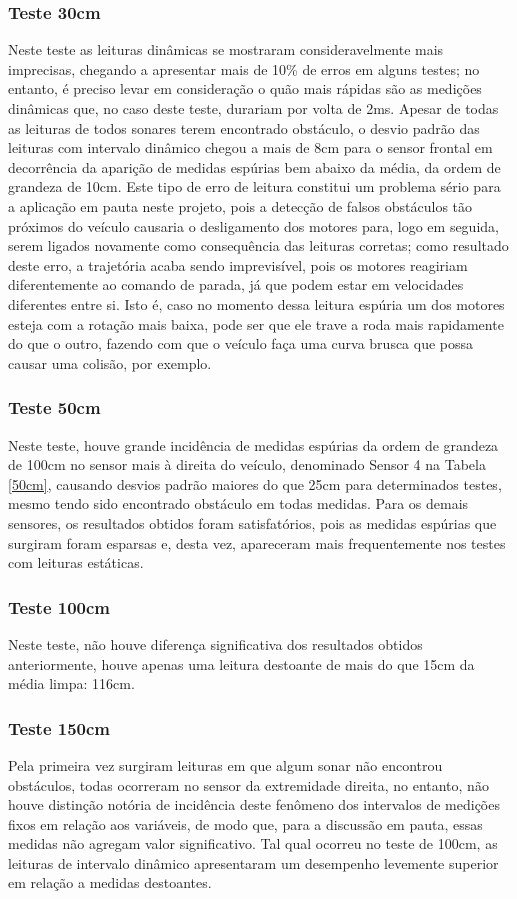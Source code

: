 \subsubsection{Teste 30cm}
Neste teste as leituras dinâmicas se mostraram consideravelmente mais imprecisas, chegando a apresentar mais de 10\% de erros em alguns testes; no 
entanto, é preciso levar em consideração o quão mais rápidas são as medições dinâmicas que, no caso deste teste, durariam por volta de 2ms.
Apesar de todas as leituras de todos sonares terem encontrado obstáculo, o desvio padrão das leituras com intervalo dinâmico chegou a mais de 8cm 
para o sensor frontal em decorrência da aparição de medidas espúrias bem abaixo da média, da ordem de grandeza de 10cm. 
Este tipo de erro de leitura constitui um problema sério para a aplicação em pauta neste projeto, pois a detecção de falsos obstáculos tão próximos 
do veículo causaria o desligamento dos motores para, logo em seguida, serem ligados novamente como consequência das leituras corretas; como resultado 
deste erro, a trajetória acaba sendo imprevisível, pois os motores reagiriam diferentemente ao comando de parada, já que podem estar em velocidades 
diferentes entre si. Isto é, caso no momento dessa leitura espúria um dos motores esteja com a rotação mais baixa, pode ser que ele trave a roda mais 
rapidamente do que o outro, fazendo com que o veículo faça uma curva brusca que possa causar uma colisão, por exemplo.
\subsubsection{Teste 50cm}
Neste teste, houve grande incidência de medidas espúrias da ordem de grandeza de 100cm no sensor mais à direita do veículo, denominado Sensor 4 na 
Tabela \ref{50cm}, causando desvios padrão maiores do que 25cm para determinados testes, mesmo tendo sido encontrado obstáculo em todas medidas.
Para os demais sensores, os resultados obtidos foram satisfatórios, pois as medidas espúrias que surgiram foram esparsas e, desta vez, apareceram 
mais frequentemente nos testes com leituras estáticas.
\subsubsection{Teste 100cm}
Neste teste, não houve diferença significativa dos resultados obtidos anteriormente, houve apenas uma leitura destoante de mais do que 15cm 
da média limpa: 116cm. 
\subsubsection{Teste 150cm}
Pela primeira vez surgiram leituras em que algum sonar não encontrou obstáculos, todas ocorreram no sensor da extremidade direita, no entanto, não 
houve distinção notória de incidência deste fenômeno dos intervalos de medições fixos em relação aos variáveis, de modo que, para a discussão em 
pauta, essas medidas não agregam valor significativo.
Tal qual ocorreu no teste de 100cm, as leituras de intervalo dinâmico apresentaram um desempenho levemente superior em relação a medidas destoantes.
